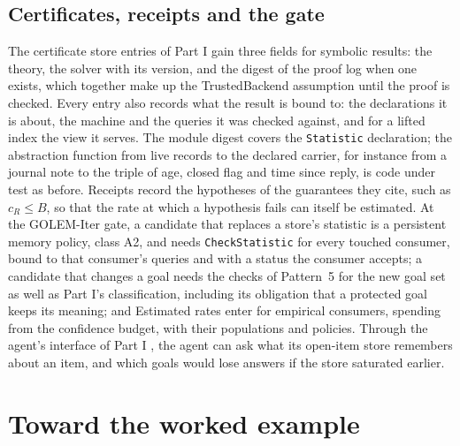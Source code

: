 \documentclass[11pt]{article}
\newcommand{\code}[1]{\texttt{#1}}
\theoremstyle{definition}
\theoremstyle{plain}
\begin{document}
\subsection{Certificates, receipts and the gate}

The certificate store entries of Part I \cite[Appendix~C.2]{part1} gain three fields for symbolic
results: the theory, the solver with its version, and the digest of the proof log when one exists,
which together make up the TrustedBackend assumption until the proof is checked. Every entry also
records what the result is bound to: the declarations it is about, the machine and the queries it
was checked against, and for a lifted index the view it serves. The module digest covers the
\code{Statistic} declaration; the abstraction function from live
records to the declared carrier, for instance from a journal note to the triple of age, closed flag
and time since reply, is code under test as before. Receipts record the hypotheses of the
guarantees they cite, such as $c_R\le B$, so that the rate at which a hypothesis fails can itself be
estimated. At the GOLEM-Iter gate, a candidate that replaces a store's statistic is a persistent
memory policy, class A2, and needs \code{CheckStatistic} for every touched consumer, bound to that
consumer's queries and with a status the consumer accepts; a candidate that changes a goal needs the
checks of Pattern~5 for the new goal set as well as Part I's classification, including its
obligation that a protected goal keeps its meaning; and Estimated rates enter for empirical
consumers, spending from the confidence budget, with their populations and policies. Through the agent's interface of Part I \cite[Section~12.4]{part1}, the agent can ask what
its open-item store remembers about an item, and which goals would lose answers if the store
saturated earlier.

\section{Toward the worked example}\label{sec:toward}
\end{document}
